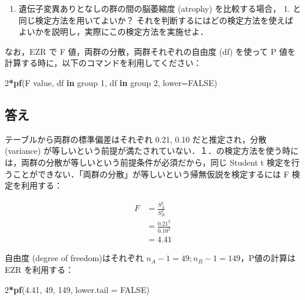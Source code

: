 \documentclass[11pt,]{problemset}
\newenvironment{Shaded}{\begin{snugshade}}{\end{snugshade}}
\newcommand{\ControlFlowTok}[1]{\textcolor[rgb]{0.13,0.29,0.53}{\textbf{#1}}}
\newcommand{\DataTypeTok}[1]{\textcolor[rgb]{0.13,0.29,0.53}{#1}}
\newcommand{\DecValTok}[1]{\textcolor[rgb]{0.00,0.00,0.81}{#1}}
\newcommand{\FloatTok}[1]{\textcolor[rgb]{0.00,0.00,0.81}{#1}}
\newcommand{\KeywordTok}[1]{\textcolor[rgb]{0.13,0.29,0.53}{\textbf{#1}}}
\newcommand{\NormalTok}[1]{#1}
\newcommand{\OperatorTok}[1]{\textcolor[rgb]{0.81,0.36,0.00}{\textbf{#1}}}
\newcommand{\OtherTok}[1]{\textcolor[rgb]{0.56,0.35,0.01}{#1}}
\providecommand{\tightlist}{%
  \setlength{\itemsep}{0pt}\setlength{\parskip}{0pt}}
\begin{document}
\begin{enumerate}
\def\labelenumi{\arabic{enumi}.}
\setcounter{enumi}{1}
\tightlist
\item
  遺伝子変異ありとなしの群の間の脳萎縮度 (atrophy) を比較する場合， 1.
  と同じ検定方法を用いてよいか？
  それを判断するにはどの検定方法を使えばよいかを説明し，実際にこの検定方法を実施せよ．
\end{enumerate}

なお，EZR で F 値，両群の分散，両群それぞれの自由度 (df) を使って P
値を計算する時に，以下のコマンドを利用してください：

\begin{Shaded}
\begin{Highlighting}[]
\DecValTok{2}\OperatorTok{*}\KeywordTok{pf}\NormalTok{(F value, df }\ControlFlowTok{in}\NormalTok{ group }\DecValTok{1}\NormalTok{, df }\ControlFlowTok{in}\NormalTok{ group }\DecValTok{2}\NormalTok{, }\DataTypeTok{lower=}\OtherTok{FALSE}\NormalTok{)}
\end{Highlighting}
\end{Shaded}

\hypertarget{-1}{%
\subsection{答え}\label{-1}}

テーブルから両群の標準偏差はそれぞれ 0.21, 0.10 だと推定され，分散
(variance)
が等しいという前提が満たされていない．１．の検定方法を使う時には，両群の分散が等しいという前提条件が必須だから，同じ
Student t
検定を行うことができない．「両群の分散」が等しいという帰無仮説を検定するには
F 検定を利用する：

\[
\begin{aligned}
F & = \frac{S^2_A}{S^2_B} \\
  & = \frac{0.21^2}{0.10^2} \\
  & = 4.41
\end{aligned}
\]

自由度 (degree of freedom)はそれぞれ
\(n_A - 1 = 49; n_B -1 = 149\)，P値の計算は EZR を利用する：

\begin{Shaded}
\begin{Highlighting}[]
\DecValTok{2}\OperatorTok{*}\KeywordTok{pf}\NormalTok{(}\FloatTok{4.41}\NormalTok{, }\DecValTok{49}\NormalTok{, }\DecValTok{149}\NormalTok{, }\DataTypeTok{lower.tail =} \OtherTok{FALSE}\NormalTok{)}
\end{Highlighting}
\end{Shaded}
\end{document}
